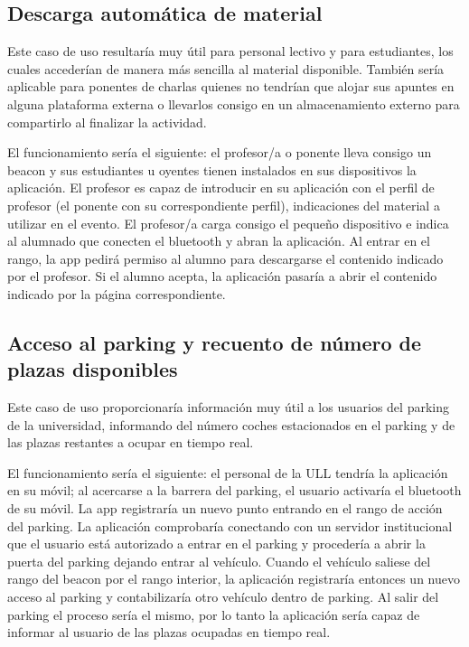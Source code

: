 \subsection{Descarga automática de material} \label{sec:descargaautomatica}

Este caso de uso resultaría muy útil para personal lectivo y para estudiantes, los cuales accederían de manera más sencilla al material disponible. También sería aplicable para ponentes de charlas quienes no tendrían que alojar sus apuntes en alguna plataforma externa o llevarlos consigo en  un almacenamiento externo para compartirlo al finalizar la actividad.

El funcionamiento sería el siguiente: el profesor/a o ponente lleva consigo un beacon y sus estudiantes u oyentes tienen instalados en sus dispositivos la aplicación. El profesor es capaz de introducir en su aplicación con el perfil de profesor (el ponente con su correspondiente perfil), indicaciones del material a utilizar en el evento. El profesor/a carga consigo el pequeño dispositivo e indica al alumnado que conecten el bluetooth y abran la aplicación. Al entrar en el rango, la app pedirá permiso al alumno para descargarse el contenido indicado por el profesor. Si el alumno acepta, la aplicación pasaría a abrir  el contenido indicado por la página correspondiente.


\subsection{Acceso al parking y recuento de número de plazas disponibles}


Este caso de uso proporcionaría información muy útil a los usuarios del parking de la universidad, informando del número coches estacionados en el parking y de las plazas restantes a ocupar en tiempo real.

El funcionamiento sería el siguiente: el personal de la ULL tendría la aplicación en su móvil; al acercarse a la barrera del parking, el usuario activaría el bluetooth de su móvil. La app registraría un nuevo punto entrando en el rango de acción del parking. La aplicación comprobaría conectando con un servidor institucional que el usuario está autorizado a entrar en el parking y procedería a abrir la puerta del parking dejando entrar al vehículo. Cuando el vehículo saliese del rango del beacon por el rango interior, la aplicación registraría entonces un nuevo acceso al parking y contabilizaría otro vehículo dentro de parking. Al salir del parking el proceso sería el mismo, por lo tanto la aplicación sería capaz de informar al usuario de las plazas ocupadas en tiempo real.


